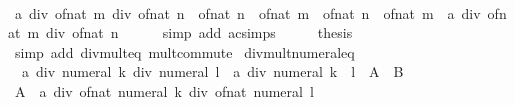 \begin{isabellebody}
\ \ \isamarkupfalse%
\ \isamarkupfalse%
\ {\isachardoublequoteopen}a\ div\ of{\isacharunderscore}{\kern0pt}nat\ m\ div\ of{\isacharunderscore}{\kern0pt}nat\ n\ {\isacharasterisk}{\kern0pt}\ of{\isacharunderscore}{\kern0pt}nat\ n\ {\isacharasterisk}{\kern0pt}\ of{\isacharunderscore}{\kern0pt}nat\ m\ {\isacharequal}{\kern0pt}\ of{\isacharunderscore}{\kern0pt}nat\ n\ {\isacharasterisk}{\kern0pt}\ of{\isacharunderscore}{\kern0pt}nat\ m\ {\isacharasterisk}{\kern0pt}\ {\isacharparenleft}{\kern0pt}a\ div\ of{\isacharunderscore}{\kern0pt}nat\ m\ div\ of{\isacharunderscore}{\kern0pt}nat\ n{\isacharparenright}{\kern0pt}{\isachardoublequoteclose}\isanewline
\ \ \ \ \isamarkupfalse%
\ {\isacharparenleft}{\kern0pt}simp\ add{\isacharcolon}{\kern0pt}\ ac{\isacharunderscore}{\kern0pt}simps{\isacharparenright}{\kern0pt}\isanewline
\ \ \isamarkupfalse%
\ \isamarkupfalse%
\ {\isacharquery}{\kern0pt}thesis\isanewline
\ \ \ \ \isamarkupfalse%
\ {\isacharparenleft}{\kern0pt}simp\ add{\isacharcolon}{\kern0pt}\ div{\isacharunderscore}{\kern0pt}mult{}{\isacharunderscore}{\kern0pt}eq{\isacharprime}{\kern0pt}\ mult{\isacharunderscore}{\kern0pt}commute{\isacharparenright}{\kern0pt}\isanewline
{}\isamarkupfalse%
%
\endisatagproof
{\isafoldproof}%
%
\isadelimproof
\isanewline
%
\endisadelimproof
\isanewline
{}\isamarkupfalse%
\ div{\isacharunderscore}{\kern0pt}mult{}{\isacharunderscore}{\kern0pt}numeral{\isacharunderscore}{\kern0pt}eq{\isacharcolon}{\kern0pt}\isanewline
\ \ {\isachardoublequoteopen}a\ div\ numeral\ k\ div\ numeral\ l\ {\isacharequal}{\kern0pt}\ a\ div\ numeral\ {\isacharparenleft}{\kern0pt}k\ {\isacharasterisk}{\kern0pt}\ l{\isacharparenright}{\kern0pt}{\isachardoublequoteclose}\ {\isacharparenleft}{\kern0pt}\ {\isachardoublequoteopen}{\isacharquery}{\kern0pt}A\ {\isacharequal}{\kern0pt}\ {\isacharquery}{\kern0pt}B{\isachardoublequoteclose}{\isacharparenright}{\kern0pt}\isanewline
%
\isadelimproof
%
\endisadelimproof
%
\isatagproof
{}\isamarkupfalse%
\ {\isacharminus}{\kern0pt}\isanewline
\ \ \isamarkupfalse%
\ {\isachardoublequoteopen}{\isacharquery}{\kern0pt}A\ {\isacharequal}{\kern0pt}\ a\ div\ of{\isacharunderscore}{\kern0pt}nat\ {\isacharparenleft}{\kern0pt}numeral\ k{\isacharparenright}{\kern0pt}\ div\ of{\isacharunderscore}{\kern0pt}nat\ {\isacharparenleft}{\kern0pt}numeral\ l{\isacharparenright}{\kern0pt}{\isachardoublequoteclose}\isanewline
\ \ \ \ \isamarkupfalse%

\end{isabellebody}
